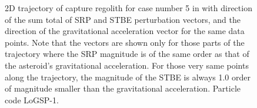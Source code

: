 \begin{figure}[htb]
\caption{2D trajectory of capture regolith for case number 5 in  with direction of the sum total of \gls{SRP} and \gls{STBE} perturbation vectors, and the direction of the gravitational acceleration vector for the same data points. Note that the vectors are shown only for those parts of the trajectory where the \gls{SRP} magnitude is of the same order as that of the asteroid's gravitational acceleration. For those very same points along the trajectory, the magnitude of the \gls{STBE} is always 1.0 order of magnitude smaller than the gravitational acceleration. Particle code LoGSP-1.}
\end{figure}
\FloatBarrier
